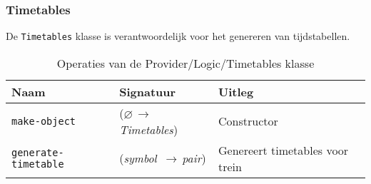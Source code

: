 \documentclass[a4paper, 11pt]{article}
\newcommand{\naar}{\,$\rightarrow$\,}
\renewcommand{\empty}{$\varnothing$}
\newcommand{\<}{\scriptsize\textless\normalsize}
\renewcommand{\>}{\scriptsize\textgreater\normalsize}
\begin{document}
\subsubsection{Timetables} %
De \texttt{Timetables} klasse is verantwoordelijk voor het genereren van tijdstabellen.
\begin{table}[H]
	\begin{center}
		{
			\begin{tabular}{|l l l|}
				\hline
				\textbf{Naam} & \textbf{Signatuur} & \textbf{Uitleg}\\
				\hline
				\texttt{make-object} & (\empty \naar \textit{Timetables}) & Constructor\\
				\hline
				\texttt{generate-timetable} & (\textit{symbol} \naar \textit{pair}) & Genereert timetables voor trein\\
				\hline
		\end{tabular}}
		\caption{Operaties van de Provider/Logic/Timetables klasse}
	\end{center}
\end{table}

\label{lastpage}
\end{document}
